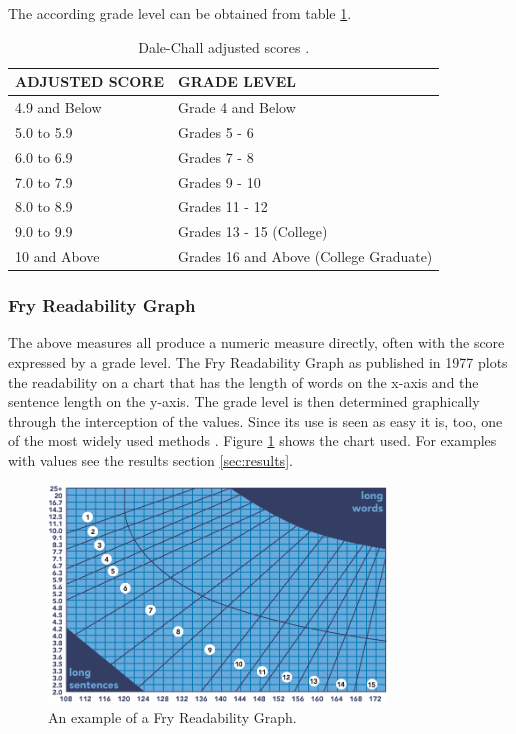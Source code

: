 \documentclass[runningheads,a4paper]{llncs}
\begin{document}
The according grade level can be obtained from table \ref{tab:dale_chall_gradelevel}.

\begin{table}[htbp]
  \centering
  \caption{Dale-Chall adjusted scores \cite{Dubay2007}.}
    \begin{tabular}{ll}
    \addlinespace
    \toprule
    ADJUSTED SCORE & GRADE LEVEL \\
    \midrule
    4.9 and Below & Grade 4 and Below \\
    5.0 to 5.9 & Grades 5 - 6 \\
    6.0 to 6.9 & Grades 7 - 8 \\
    7.0 to 7.9 & Grades 9 - 10 \\
    8.0 to 8.9 & Grades 11 - 12 \\
    9.0 to 9.9 & Grades 13 - 15 (College) \\
    10 and Above & Grades 16 and Above (College Graduate) \\
    \bottomrule
    \end{tabular}%
  \label{tab:dale_chall_gradelevel}%
\end{table}

\subsubsection{Fry Readability Graph}
The above measures all produce a numeric measure directly, often with the score expressed by a grade level. The Fry Readability Graph as published in 1977 plots the readability on a chart that has the length of words on the x-axis and the sentence length on the y-axis. The grade level is then determined graphically through the interception of the values. Since its use is seen as easy it is, too, one of the most widely used methods \cite{Fry2006} \cite{Dubay2007}. Figure \ref{fig:fry_chart} shows the chart used. For examples with values see the results section \ref{sec:results}.

\begin{figure}
\centering
\includegraphics[width=0.8\textwidth]{Bilder/Fry_Graph.png} %
\caption{An example of a Fry Readability Graph.}
\label{fig:fry_chart}
\end{figure}
\end{document}
